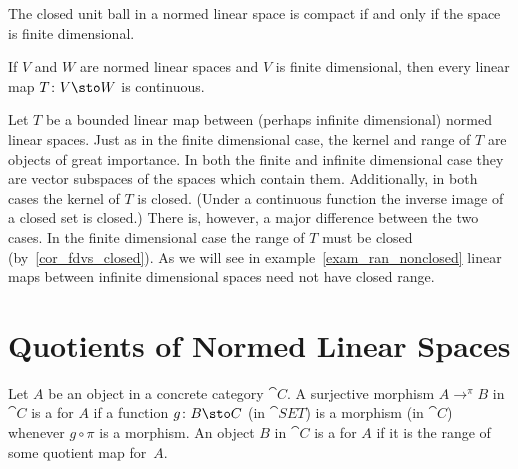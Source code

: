 \begin{prop}\label{00015032} The closed unit ball in a normed linear space is compact if and only if
the space is finite dimensional.
\end{prop}

\begin{prop}\label{00015033} If $V$ and $W$ are normed linear spaces and $V$ is finite dimensional, then
every linear map $T \colon V \sto W$ is continuous.
\end{prop}

Let $T$ be a bounded linear map between (perhaps infinite dimensional) normed linear spaces. Just as in the finite
dimensional case, the kernel and range of $T$ are objects of great importance.  In both the finite and infinite dimensional
case they are vector subspaces of the spaces which contain them.  Additionally, in both cases the kernel of $T$ is closed.
(Under a continuous function the inverse image of a closed set is closed.)  There is, however, a major difference between
the two cases.  In the finite dimensional case the range of $T$ must be closed (by~\ref{cor_fdvs_closed}).  As we will see
in example~\ref{exam_ran_nonclosed} linear maps between infinite dimensional spaces need not have closed range.






















\section{Quotients of Normed Linear Spaces}

\begin{defn}\label{quo001def} Let $A$ be an object in a concrete category $\cat C$.
A surjective morphism $A \to^\pi B$ in $\cat C$ is a
 for $A$ if a function $g\colon B \sto C$ (in $\cat{SET}$) is a morphism
(in $\cat C$) whenever $g \circ \pi$ is a morphism. An object $B$ in $\cat C$ is a
 for $A$ if it is the range of some quotient map for~$A$.
\end{defn}

